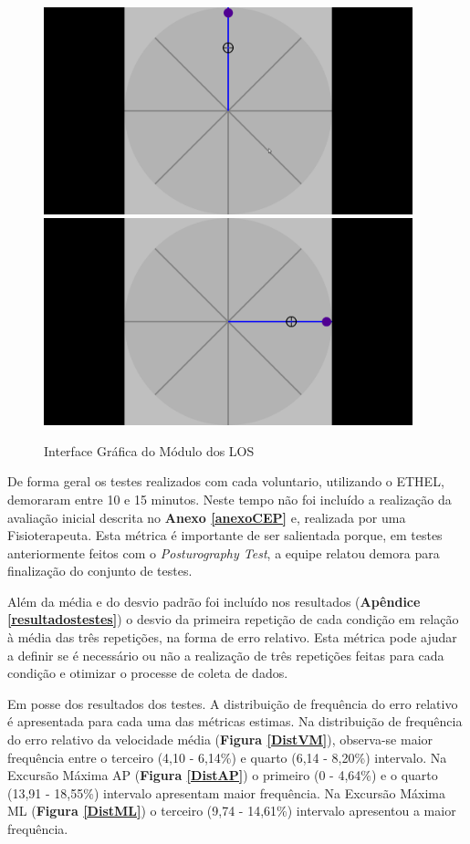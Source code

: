 \begin{figure}[ht]
\captionsetup{justification   = raggedright,
              singlelinecheck = false}
\caption{Interface Gráfica do Módulo dos LOS} \label{LOS}
\begin{center}
	\includegraphics[height=6cm]{figs/LOS1.png} \quad
	\includegraphics[height=6cm]{figs/LOS2.png}
\end{center}
\end{figure}

De forma geral os testes realizados com cada voluntario, utilizando o ETHEL, demoraram entre 10 e 15 minutos. Neste tempo não foi incluído a realização da avaliação inicial descrita no \textbf{Anexo \ref{anexoCEP}} e, realizada por uma Fisioterapeuta. Esta métrica é importante de ser salientada porque, em testes anteriormente feitos com o \textit{Posturography Test}, a equipe relatou demora para 
finalização do conjunto de testes.

Além da média e do desvio padrão foi  incluído nos resultados (\textbf{Apêndice \ref{resultadostestes}}) o desvio da primeira repetição de cada condição em relação à média das três repetições, na forma de erro relativo. Esta métrica pode ajudar a definir se é necessário ou não a realização de três repetições feitas para cada condição e otimizar o processe de coleta de dados. 

Em posse dos resultados dos testes. A distribuição de frequência do erro relativo é apresentada para cada uma das métricas estimas. Na distribuição de frequência do erro relativo da velocidade média (\textbf{Figura \ref{DistVM}}), observa-se maior frequência entre o terceiro (4,10 - 6,14\%) e quarto (6,14 - 8,20\%) intervalo. Na Excursão Máxima AP (\textbf{Figura \ref{DistAP}}) o primeiro (0 - 4,64\%) e o quarto (13,91 - 18,55\%) intervalo apresentam maior frequência. Na Excursão Máxima ML (\textbf{Figura \ref{DistML}}) o terceiro (9,74 - 14,61\%) intervalo apresentou a maior frequência.



